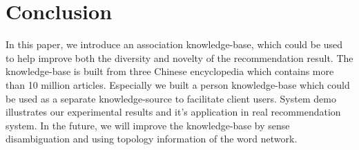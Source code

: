 \section{Conclusion}
In this paper, we introduce an association knowledge-base, which could be used to help improve both the diversity and novelty of the recommendation result. The knowledge-base is built from three Chinese encyclopedia which contains more
than 10 million articles. Especially we built a person knowledge-base which could be used as a separate knowledge-source to facilitate client users. System demo illustrates our experimental results and it's application in real recommendation system. In the future, we will improve the knowledge-base by sense disambiguation and using topology information of the word network. 